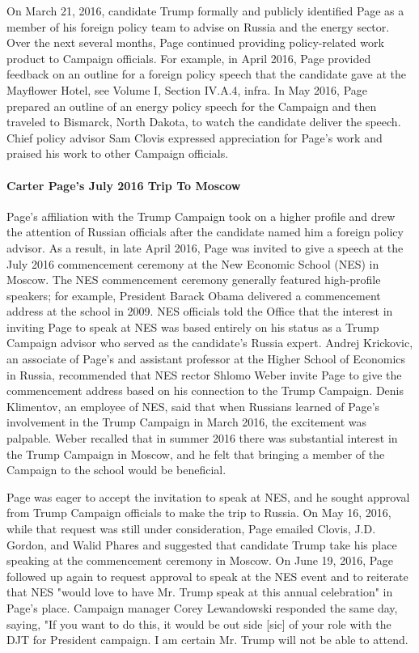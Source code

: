 On March 21, 2016, candidate Trump formally and publicly identified Page as a member of his foreign policy team to advise on Russia and the energy sector.%
Over the next several months, Page continued providing policy-related work product to Campaign officials.
For example, in April 2016, Page provided feedback on an outline for a foreign policy speech that the candidate gave at the Mayflower Hotel,%
see Volume I, Section IV.A.4, infra.
In May 2016, Page prepared an outline of an energy policy speech for the Campaign and then traveled to Bismarck, North Dakota, to watch the candidate deliver the speech.%
Chief policy advisor Sam Clovis expressed appreciation for Page's work and praised his work to other Campaign officials.%

\paragraph{Carter Page's July 2016 Trip To Moscow}

Page's affiliation with the Trump Campaign took on a higher profile and drew the attention of Russian officials after the candidate named him a foreign policy advisor.
As a result, in late April 2016, Page was invited to give a speech at the July 2016 commencement ceremony at the New Economic School (NES) in Moscow.%
The NES commencement ceremony generally featured high-profile speakers; for example, President Barack Obama delivered a commencement address at the school in 2009.%
NES officials told the Office that the interest in inviting Page to speak at NES was based entirely on his status as a Trump Campaign advisor who served as the candidate's Russia expert.%
Andrej Krickovic, an associate of Page's and assistant professor at the Higher School of Economics in Russia, recommended that NES rector Shlomo Weber invite Page to give the commencement address based on his connection to the Trump Campaign.%
Denis Klimentov, an employee of NES, said that when Russians learned of Page's involvement in the Trump Campaign in March 2016, the excitement was palpable.%
Weber recalled that in summer 2016 there was substantial interest in the Trump Campaign in Moscow, and he felt that bringing a member of the Campaign to the school would be beneficial.%

Page was eager to accept the invitation to speak at NES, and he sought approval from Trump Campaign officials to make the trip to Russia.%
On May 16, 2016, while that request was still under consideration, Page emailed Clovis, J.D. Gordon, and Walid Phares and suggested that candidate Trump take his place speaking at the commencement ceremony in Moscow.%
On June 19, 2016, Page followed up again to request approval to speak at the NES event and to reiterate that NES "would love to have Mr. Trump speak at this annual celebration" in Page's place.%
Campaign manager Corey Lewandowski responded the same day, saying, "If you want to do this, it would be out side [sic] of your role with the DJT for President campaign. I am certain Mr. Trump will not be able to attend.%

